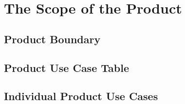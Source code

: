 \chapter{The Scope of the Product}

\section{Product Boundary}

\section{Product Use Case Table}

\section{Individual Product Use Cases}
